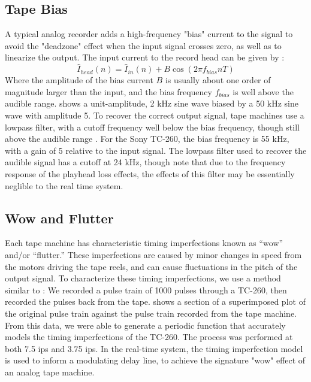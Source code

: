 \documentclass[twoside,a4paper]{article}
\begin{document}
\subsection{Tape Bias}
\label{bias}
A typical analog recorder adds a high-frequency "bias"
current to the signal to avoid the "deadzone" effect when the input signal
crosses zero, as well as to linearize the output. The input
current to the record head can be given by
\cite{Camras:1987:MRH:27189}:
\begin{equation}
    \hat{I}_{head}(n) = \hat{I}_{in}(n) + B \cos(2 \pi f_{bias} n T)
    \label{eq:bias}
\end{equation}
%
Where the amplitude of the bias current $B$ is usually
about one order of magnitude larger than the input,
and the bias frequency $f_{bias}$ is well above the
audible range.  shows a unit-amplitude,
2 kHz sine wave biased by a 50 kHz sine wave with amplitude 5.
To recover the correct output signal, tape machines use a
lowpass filter, with a cutoff frequency well below the bias
frequency, though still above the audible range \cite{Kadis}.
\newline\newline
For the Sony TC-260, the bias frequency is 55 kHz, with a gain
of 5 relative to the input signal. The lowpass filter used to recover
the audible signal has a cutoff at 24 kHz, though note that due to
the frequency response of the playhead loss effects, the effects
of this filter may be essentially neglible to the real time system.
\cite{RefManual}

\subsection{Wow and Flutter} \label{flutter}
Each tape machine has characteristic timing imperfections
known as ``wow'' and/or ``flutter.'' These imperfections
are caused by minor changes in speed from the motors
driving the tape reels, and can cause fluctuations in
the pitch of the output signal. To characterize these
timing imperfections, we use a method similar to \cite{tapeDelay}:
We recorded a pulse train of 1000 pulses through a TC-260,
then recorded the pulses back from the tape. 
shows a section of a superimposed plot of the original
pulse train against the pulse train recorded from the tape
machine. From this data, we were able to generate a periodic
function that accurately models the timing imperfections of
the TC-260. The process was performed at both 7.5 ips and 3.75
ips. In the real-time system, the timing imperfection model
is used to inform a modulating delay line, to achieve the
signature "wow" effect of an analog tape machine.
\end{document}
